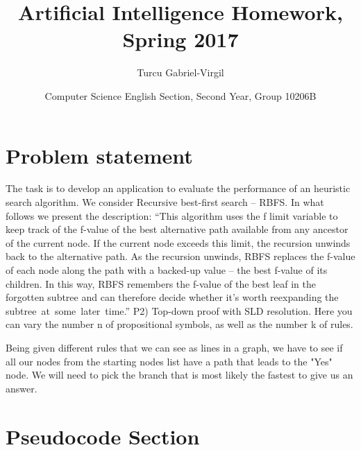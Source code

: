 \documentclass{article}
\begin{document}

\title{Artificial Intelligence Homework, Spring 2017}
\author{Turcu Gabriel-Virgil }
\date{Computer Science English Section, Second Year, Group 10206B}
\maketitle
\pagebreak



\section{Problem statement}

The task is to develop an application to evaluate the performance of an heuristic
search algorithm.
We consider Recursive best-first search – RBFS. In what follows we present
the description:
“This algorithm uses the f limit variable to keep track of the f-value of the
best alternative path available from any ancestor of the current node. If the
current node exceeds this limit, the recursion unwinds back to the alternative
path. As the recursion unwinds, RBFS replaces the f-value of each node along
the path with a backed-up value – the best f-value of its children. In this way,
RBFS remembers the f-value of the best leaf in the forgotten subtree and can
therefore decide whether it’s worth reexpanding the \mbox{subtree at some later time.}”
\linebreak
\linebreak
P2) Top-down proof with SLD resolution. Here you can vary the number n of
propositional symbols, as well as the number k of rules.

Being given different rules that we can see as lines in a graph, we have to see if all our nodes from the starting nodes list have a path that leads to the "Yes" node. We will need to pick the branch that is most likely the fastest to give us an answer.
\section{Pseudocode Section}
 
\end{document}
